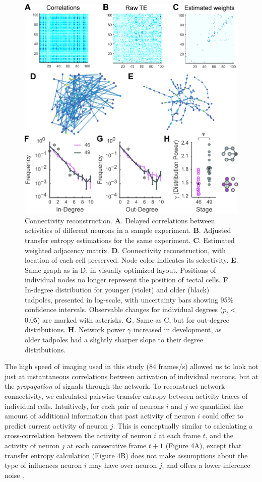 \documentclass{article}
\begin{document}
\begin{figure}[t!]
\includegraphics[width=\linewidth]{fig4.pdf}
\caption{
Connectivity reconstruction.  \textbf{A}. Delayed correlations between activities of different neurons in a sample experiment. \textbf{B}. Adjusted transfer entropy estimations for the same experiment. \textbf{C}. Estimated weighted adjacency matrix. \textbf{D}. Connectivity reconstruction, with location of each cell preserved. Node color indicates its selectivity. \textbf{E}. Same graph as in D, in visually optimized layout. Positions of individual nodes no longer represent the position of tectal cells. \textbf{F}. In-degree distribution for younger (violet) and older (black) tadpoles, presented in log-scale, with uncertainty bars showing 95\% confidence intervals. Observable changes for individual degrees ($p_t<$ 0.05) are marked with asterisks. \textbf{G}. Same as C, but for out-degree distributions. \textbf{H}. Network power $\gamma$ increased in development, as older tadpoles had a slightly sharper slope to their degree distributions. }
\end{figure}

The high speed of imaging used in this study (84 frames/s) allowed us to look not just at instantaneous correlations between activation of individual neurons, but at the \textit{propagation} of signals through the network. To reconstruct network connectivity, we calculated pairwise transfer entropy \citep{gourevitch2007te, stetter2012te} between activity traces of individual cells. Intuitively, for each pair of neurons $i$ and $j$ we quantified the amount of additional information that past activity of neuron $i$ could offer to predict current activity of neuron $j$. This is conceptually similar to calculating a cross-correlation between the activity of neuron $i$ at each frame $t$, and the activity of neuron $j$ at each consecutive frame $t+1$ (Figure 4A), except that transfer entropy calculation (Figure 4B) does not make assumptions about the type of influences neuron $i$ may have over neuron $j$, and offers a lower inference noise \citep{stetter2012te}.
\end{document}
